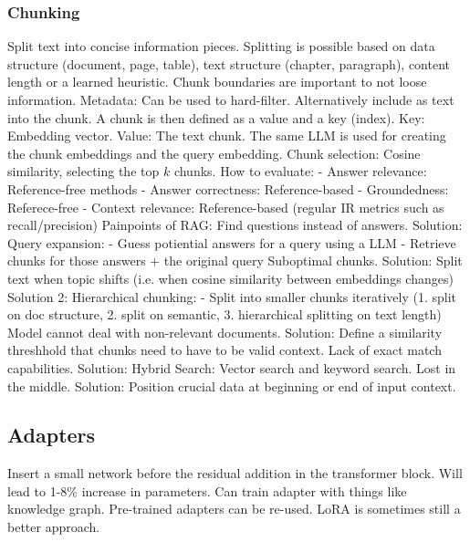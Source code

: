 \documentclass{scrartcl}
\begin{document}
\subsubsection*{Chunking}
Split text into concise information pieces. Splitting is possible based on data structure (document, page, table), text structure (chapter, paragraph), content length or a learned heuristic.
Chunk boundaries are important to not loose information.
Metadata: Can be used to hard-filter. Alternatively include as text into the chunk.
A chunk is then defined as a value and a key (index).
Key: Embedding vector.
Value: The text chunk.
The same LLM is used for creating the chunk embeddings and the query embedding.
Chunk selection: Cosine similarity, selecting the top $k$ chunks.
How to evaluate:
- Answer relevance: Reference-free methods
- Answer correctness: Reference-based
- Groundedness: Referece-free
- Context relevance: Reference-based (regular IR metrics such as recall/precision)
Painpoints of RAG:
Find questions instead of answers. Solution: Query expansion:
- Guess potiential answers for a query using a LLM
- Retrieve chunks for those answers + the original query
Suboptimal chunks. Solution: Split text when topic shifts (i.e. when cosine similarity between embeddings changes)
Solution 2: Hierarchical chunking:
- Split into smaller chunks iteratively (1. split on doc structure, 2. split on semantic, 3. hierarchical splitting on text length)
Model cannot deal with non-relevant documents. Solution: Define a similarity threshhold that chunks need to have to be valid context.
Lack of exact match capabilities. Solution: Hybrid Search: Vector search and keyword search.
Lost in the middle. Solution: Position crucial data at beginning or end of input context.

\subsection*{Adapters}
Insert a small network before the residual addition in the transformer block.
Will lead to 1-8\% increase in parameters.
Can train adapter with things like knowledge graph.
Pre-trained adapters can be re-used.
LoRA is sometimes still a better approach.
\end{document}
